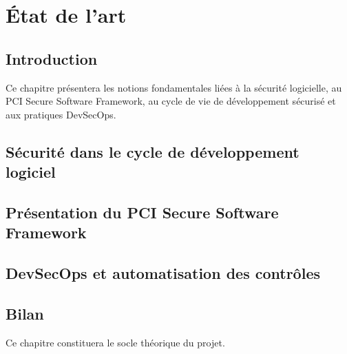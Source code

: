 \chapter{État de l'art}
\clearpage

\section{Introduction}

Ce chapitre présentera les notions fondamentales liées à la sécurité logicielle, au PCI Secure Software Framework, au cycle de vie de développement sécurisé et aux pratiques DevSecOps.

\section{Sécurité dans le cycle de développement logiciel}


\section{Présentation du PCI Secure Software Framework}


\section{DevSecOps et automatisation des contrôles}


\section{Bilan}

Ce chapitre constituera le socle théorique du projet.

\clearpage
